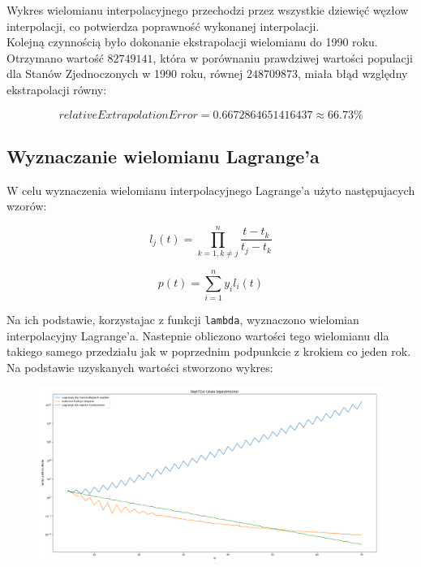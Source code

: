 \documentclass{article}
\begin{document}
	Wykres wielomianu interpolacyjnego przechodzi przez wszystkie dziewięć węzłow interpolacji, co potwierdza poprawność wykonanej interpolacji.\\
	Kolejną czynnością było dokonanie ekstrapolacji wielomianu do 1990 roku. Otrzymano wartość $82749141$, która w porównaniu prawdziwej wartości populacji dla Stanów Zjednoczonych w 1990 roku, równej $248709873$, miała błąd względny ekstrapolacji równy:
	
	\begin{equation}
		relativeExtrapolationError = 0.6672864651416437 \approx 66.73 \%
	\end{equation}
	
	
	
	\subsection*{Wyznaczanie wielomianu Lagrange'a}
	
	W celu wyznaczenia wielomianu interpolacyjnego Lagrange'a użyto następujacych wzorów:
	
	\begin{equation}
		l_j (t) = \prod _{k=1, k \neq j} ^ n \frac{t-t_k}{t_j - t_k}
	\end{equation}
	
	\begin{equation}
		p (t) = \sum _{i=1} ^n y_i  l_i(t)
	\end{equation}
	
	Na ich podstawie, korzystajac z funkcji \texttt{lambda}, wyznaczono wielomian interpolacyjny Lagrange'a. Nastepnie obliczono wartości tego wielomianu dla takiego samego przedziału jak w poprzednim podpunkcie z krokiem co jeden rok. Na podstawie uzyskanych wartości stworzono wykres:
	
	\begin{figure}[h]
    		\centering
  		\includegraphics[scale = 0.9]{wykres2.png}
	\end{figure}
	
\end{document}
